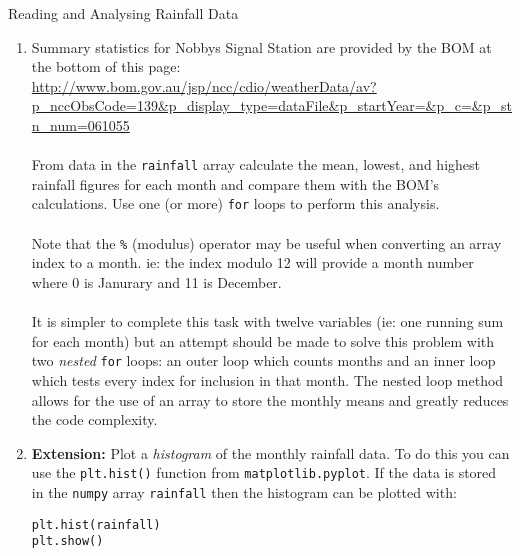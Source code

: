 \documentclass{lab}
\begin{document}
\begin{task}{Reading and Analysing Rainfall Data}{}
\begin{enumerate}
\item Summary statistics for Nobbys Signal Station are provided by the BOM at the bottom of this page: \url{http://www.bom.gov.au/jsp/ncc/cdio/weatherData/av?p_nccObsCode=139&p_display_type=dataFile&p_startYear=&p_c=&p_stn_num=061055}
\\~\\
From data in the \texttt{rainfall} array calculate the mean, lowest, and highest rainfall figures for each month and compare them with the BOM's calculations. Use one (or more) \texttt{for} loops to perform this analysis.
\\~\\
Note that the \texttt{\%} (modulus) operator may be useful when converting an array index to a month. ie: the index modulo 12 will provide a month number where 0 is Janurary and 11 is December.
\\~\\
It is simpler to complete this task with twelve variables (ie: one running sum for each month) but an attempt should be made to solve this problem with two \textit{nested} \texttt{for} loops: an outer loop which counts months and an inner loop which tests every index for inclusion in that month. The nested loop method allows for the use of an array to store the monthly means and greatly reduces the code complexity.

\item \textbf{Extension:} Plot a \textit{histogram} of the monthly rainfall data. To do this you can use the \texttt{plt.hist()} function from \texttt{matplotlib.pyplot}. If the data is stored in the \texttt{numpy} array \texttt{rainfall} then the histogram can be plotted with:

\begin{lstlisting}
plt.hist(rainfall)
plt.show()
\end{lstlisting}

\end{enumerate}
\end{task}
\end{document}
